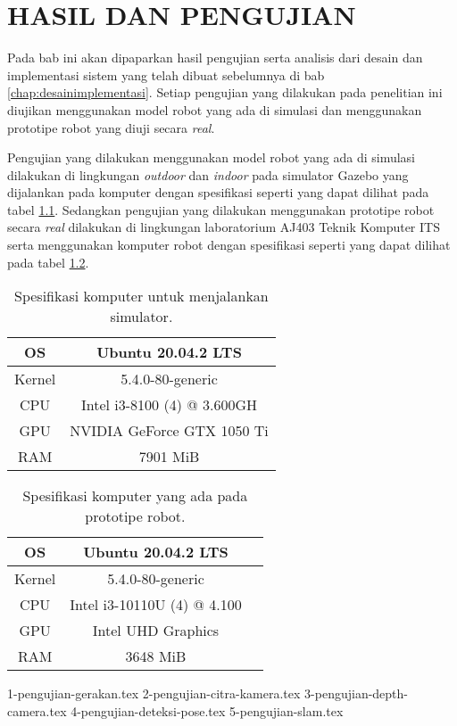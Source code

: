 \chapter{HASIL DAN PENGUJIAN}
\label{chap:hasilpengujian}

Pada bab ini akan dipaparkan hasil pengujian serta analisis dari desain dan implementasi sistem yang telah dibuat sebelumnya di bab \ref{chap:desainimplementasi}.
Setiap pengujian yang dilakukan pada penelitian ini diujikan menggunakan model robot yang ada di simulasi dan menggunakan prototipe robot yang diuji secara \emph{real}.

Pengujian yang dilakukan menggunakan model robot yang ada di simulasi dilakukan di lingkungan \emph{outdoor} dan \emph{indoor} pada simulator Gazebo yang dijalankan pada komputer dengan spesifikasi seperti yang dapat dilihat pada tabel \ref{tb:spesifikasikomputersimulator}.
Sedangkan pengujian yang dilakukan menggunakan prototipe robot secara \emph{real} dilakukan di lingkungan laboratorium AJ403 Teknik Komputer ITS serta menggunakan komputer robot dengan spesifikasi seperti yang dapat dilihat pada tabel \ref{tb:spesifikasikomputerrobot}.

\begin{longtable}{|c|c|}
  \caption{Spesifikasi komputer untuk menjalankan simulator.}
  \label{tb:spesifikasikomputersimulator}\\
  \hline
  OS      & Ubuntu 20.04.2 LTS \\
  \hline
  Kernel  & 5.4.0-80-generic \\
  \hline
  CPU     & Intel i3-8100 (4) @ 3.600GH \\
  \hline
  GPU     & NVIDIA GeForce GTX 1050 Ti \\
  \hline
  RAM     & 7901 MiB \\
  \hline
\end{longtable}

\begin{longtable}{|c|c|c|}
  \caption{Spesifikasi komputer yang ada pada prototipe robot.}
  \label{tb:spesifikasikomputerrobot}\\
  \hline
  OS      & Ubuntu 20.04.2 LTS \\
  \hline
  Kernel  & 5.4.0-80-generic \\
  \hline
  CPU     & Intel i3-10110U (4) @ 4.100 \\
  \hline
  GPU     & Intel UHD Graphics \\
  \hline
  RAM     & 3648 MiB \\
  \hline
\end{longtable}

{1-pengujian-gerakan.tex}
{2-pengujian-citra-kamera.tex}
{3-pengujian-depth-camera.tex}
{4-pengujian-deteksi-pose.tex}
{5-pengujian-slam.tex}
